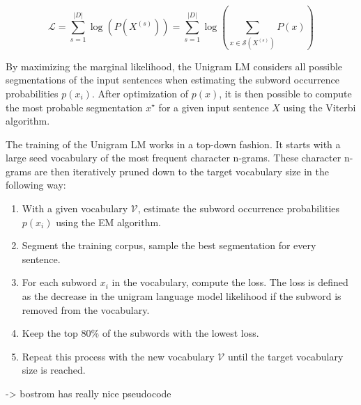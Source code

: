 \begin{equation}
    \mathcal{L} = \sum_{s=1}^{|D|} \log (P(X^{(s)})) = \sum_{s=1}^{|D|} \log( \sum_{x \in \mathcal{S}(X^{(s)})} P(x) )
\end{equation}

By maximizing the marginal likelihood, the Unigram LM considers all possible segmentations of the input sentences when estimating the subword occurrence probabilities $p(x_i)$. After optimization of $p(x)$, it is then possible to compute the most probable segmentation $x^\star$ for a given input sentence $X$ using the Viterbi algorithm.

The training of the Unigram LM works in a top-down fashion. It starts with a large seed vocabulary of the most frequent character n-grams. These character n-grams are then iteratively pruned down to the target vocabulary size in the following way:

\begin{enumerate}
    \item With a given vocabulary $\mathcal{V}$, estimate the subword occurrence probabilities $p(x_i)$ using the EM algorithm.
    \item Segment the training corpus, sample the best segmentation for every sentence.
    \item For each subword $x_i$ in the vocabulary, compute the loss. The loss is defined as the decrease in the unigram language model likelihood if the subword is removed from the vocabulary.
    \item Keep the top 80\% of the subwords with the lowest loss.
    \item Repeat this process with the new vocabulary $\mathcal{V}$ until the target vocabulary size is reached.
\end{enumerate}

-> bostrom has really nice pseudocode






